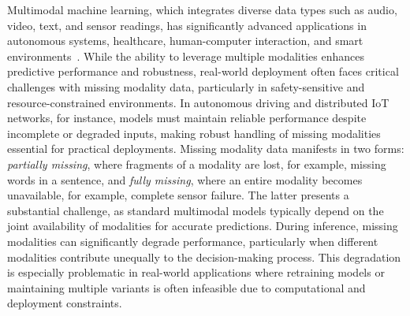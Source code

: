
Multimodal machine learning,
which integrates diverse data types
such as audio, video, text, and sensor readings,
has significantly advanced applications
in autonomous systems, healthcare, human-computer interaction,
and smart environments~\cite{He2024Multimodal,Chen2023Dialog,Ang2024Temporal,Wang2023Customer,Hu2021Identifying,Bano2024FedCMD,Yin2023Hybrid,zhao-etal-2021-missing,redcore}.
While the ability to leverage multiple modalities enhances predictive performance and robustness,
real-world deployment often faces critical challenges
with missing modality data,
particularly in safety-sensitive and resource-constrained environments.
In autonomous driving and distributed IoT networks,
for instance,
models must maintain reliable performance
despite incomplete or degraded inputs,
making robust handling of missing modalities
essential for practical deployments.
Missing modality data manifests in two forms:
\emph{partially missing},
where fragments of a modality are lost, for example, missing words in a sentence,
and \emph{fully missing},
where an entire modality becomes unavailable,
for example, complete sensor failure.
The latter presents a substantial challenge,
as standard multimodal models
typically depend on the joint availability of modalities
for accurate predictions.
During inference,
missing modalities can significantly degrade performance,
particularly when different modalities
contribute unequally to the decision-making process.
This degradation is especially problematic
in real-world applications
where retraining models or maintaining multiple variants
is often infeasible due to computational and deployment constraints.


